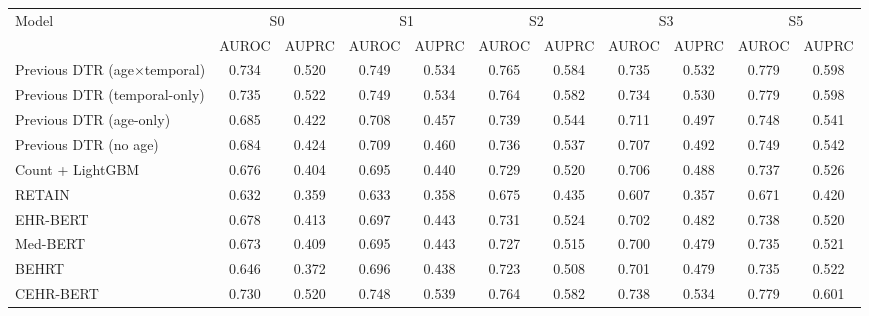 \begin{tabular}{lcccccccccc}
\toprule
Model & \multicolumn{2}{c}{S0} & \multicolumn{2}{c}{S1} & \multicolumn{2}{c}{S2} & \multicolumn{2}{c}{S3} & \multicolumn{2}{c}{S5} \\
 & AUROC & AUPRC & AUROC & AUPRC & AUROC & AUPRC & AUROC & AUPRC & AUROC & AUPRC \\
\midrule
Previous DTR (age$\times$temporal) & 0.734 & 0.520 & 0.749 & 0.534 & 0.765 & 0.584 & 0.735 & 0.532 & 0.779 & 0.598 \\
Previous DTR (temporal-only) & 0.735 & 0.522 & 0.749 & 0.534 & 0.764 & 0.582 & 0.734 & 0.530 & 0.779 & 0.598 \\
Previous DTR (age-only) & 0.685 & 0.422 & 0.708 & 0.457 & 0.739 & 0.544 & 0.711 & 0.497 & 0.748 & 0.541 \\
Previous DTR (no age) & 0.684 & 0.424 & 0.709 & 0.460 & 0.736 & 0.537 & 0.707 & 0.492 & 0.749 & 0.542 \\
Count + LightGBM & 0.676 & 0.404 & 0.695 & 0.440 & 0.729 & 0.520 & 0.706 & 0.488 & 0.737 & 0.526 \\
RETAIN & 0.632 & 0.359 & 0.633 & 0.358 & 0.675 & 0.435 & 0.607 & 0.357 & 0.671 & 0.420 \\
EHR-BERT & 0.678 & 0.413 & 0.697 & 0.443 & 0.731 & 0.524 & 0.702 & 0.482 & 0.738 & 0.520 \\
Med-BERT & 0.673 & 0.409 & 0.695 & 0.443 & 0.727 & 0.515 & 0.700 & 0.479 & 0.735 & 0.521 \\
BEHRT & 0.646 & 0.372 & 0.696 & 0.438 & 0.723 & 0.508 & 0.701 & 0.479 & 0.735 & 0.522 \\
CEHR-BERT & 0.730 & 0.520 & 0.748 & 0.539 & 0.764 & 0.582 & 0.738 & 0.534 & 0.779 & 0.601 \\
\bottomrule
\end{tabular}
